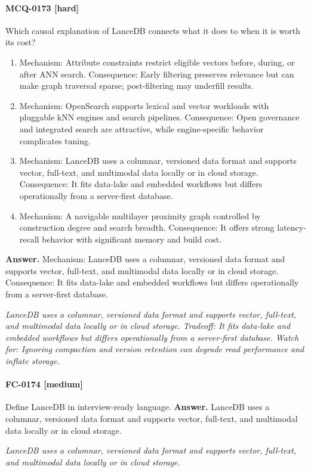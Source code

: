 \paragraph{MCQ-0173 [hard]} Which causal explanation of LanceDB connects what it does to when it is worth its cost?
\begin{enumerate}[label=\Alph*.]
\item Mechanism: Attribute constraints restrict eligible vectors before, during, or after ANN search. Consequence: Early filtering preserves relevance but can make graph traversal sparse; post-filtering may underfill results.
\item Mechanism: OpenSearch supports lexical and vector workloads with pluggable kNN engines and search pipelines. Consequence: Open governance and integrated search are attractive, while engine-specific behavior complicates tuning.
\item Mechanism: LanceDB uses a columnar, versioned data format and supports vector, full-text, and multimodal data locally or in cloud storage. Consequence: It fits data-lake and embedded workflows but differs operationally from a server-first database.
\item Mechanism: A navigable multilayer proximity graph controlled by construction degree and search breadth. Consequence: It offers strong latency-recall behavior with significant memory and build cost.
\end{enumerate}
\noindent\textbf{Answer.} Mechanism: LanceDB uses a columnar, versioned data format and supports vector, full-text, and multimodal data locally or in cloud storage. Consequence: It fits data-lake and embedded workflows but differs operationally from a server-first database.
\par\textit{LanceDB uses a columnar, versioned data format and supports vector, full-text, and multimodal data locally or in cloud storage. Tradeoff: It fits data-lake and embedded workflows but differs operationally from a server-first database. Watch for: Ignoring compaction and version retention can degrade read performance and inflate storage.}
\paragraph{FC-0174 [medium]} Define LanceDB in interview-ready language.
\noindent\textbf{Answer.} LanceDB uses a columnar, versioned data format and supports vector, full-text, and multimodal data locally or in cloud storage.
\par\textit{LanceDB uses a columnar, versioned data format and supports vector, full-text, and multimodal data locally or in cloud storage.}

